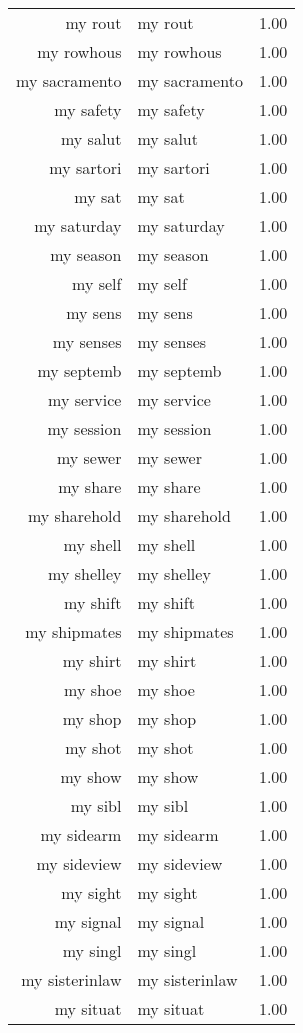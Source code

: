 \begin{table}[ht]
\begin{tabular}{rlr}
  my rout & my rout & 1.00 \\ 
  my rowhous & my rowhous & 1.00 \\ 
  my sacramento & my sacramento & 1.00 \\ 
  my safety & my safety & 1.00 \\ 
  my salut & my salut & 1.00 \\ 
  my sartori & my sartori & 1.00 \\ 
  my sat & my sat & 1.00 \\ 
  my saturday & my saturday & 1.00 \\ 
  my season & my season & 1.00 \\ 
  my self & my self & 1.00 \\ 
  my sens & my sens & 1.00 \\ 
  my senses & my senses & 1.00 \\ 
  my septemb & my septemb & 1.00 \\ 
  my service & my service & 1.00 \\ 
  my session & my session & 1.00 \\ 
  my sewer & my sewer & 1.00 \\ 
  my share & my share & 1.00 \\ 
  my sharehold & my sharehold & 1.00 \\ 
  my shell & my shell & 1.00 \\ 
  my shelley & my shelley & 1.00 \\ 
  my shift & my shift & 1.00 \\ 
  my shipmates & my shipmates & 1.00 \\ 
  my shirt & my shirt & 1.00 \\ 
  my shoe & my shoe & 1.00 \\ 
  my shop & my shop & 1.00 \\ 
  my shot & my shot & 1.00 \\ 
  my show & my show & 1.00 \\ 
  my sibl & my sibl & 1.00 \\ 
  my sidearm & my sidearm & 1.00 \\ 
  my sideview & my sideview & 1.00 \\ 
  my sight & my sight & 1.00 \\ 
  my signal & my signal & 1.00 \\ 
  my singl & my singl & 1.00 \\ 
  my sisterinlaw & my sisterinlaw & 1.00 \\ 
  my situat & my situat & 1.00 \\ 

\end{tabular}
\end{table}
